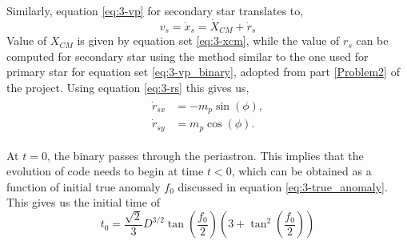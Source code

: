\documentclass[a4paper]{article}
\begin{document}
\begin{enumerate} [label*=\textbf{(\alph*)}]
					Similarly, equation \ref{eq:3-vp} for secondary star translates to,
					\begin{equation}
						v_s = \dot{x}_s = \dot{X}_{CM}^{} + \dot{r}_s
						\label{eq:3-vs}
					\end{equation}
					Value of \(X_{CM}^{}\) is given by equation set \ref{eq:3-xcm}, while the value of \(r_s\) can be computed for secondary star using the method similar to the one used for primary star for equation set \ref{eq:3-vp_binary}, adopted from part \ref{Problem2} of the project. Using equation \ref{eq:3-rs} this gives us,
					\begin{equation}
						\begin{gathered}
							\begin{aligned}
								\dot{r}_{sx} &= -m_p \sin(\phi), \\
								\dot{r}_{sy} &= m_p \cos(\phi).
							\end{aligned}
						\end{gathered} 
						\label{eq:3-vs_binary}
					\end{equation}
				
					At \(t=0\), the binary passes through the periastron. This implies that the evolution of code needs to begin at time \(t<0\), which can be obtained as a function of initial true anomaly \(f_0\) discussed in equation \ref{eq:3-true_anomaly}. This gives us the initial time of 
					\begin{equation}
						t_0 = \frac{\sqrt{2}}{3} D^{3/2} \tan \left( \frac{f_0}{2} \right) \left( 3+ \tan^2 \left( \frac{f_0}{2} \right) \right) 
						\label{eq:3-initial_time}
					\end{equation}
				

\end{enumerate}
\end{document}
